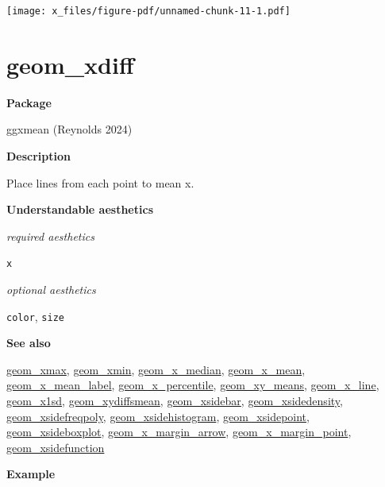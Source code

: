 \documentclass[
  letterpaper,
  DIV=11,
  numbers=noendperiod]{scrreprt}
\begin{document}
\texttt{[image: x\_files/figure-pdf/unnamed-chunk-11-1.pdf]}

\section{geom\_xdiff}\label{xdiff}

\textbf{Package}

ggxmean (Reynolds 2024)

\textbf{Description}

Place lines from each point to mean x.

\textbf{Understandable aesthetics}

\emph{required aesthetics}

\texttt{x}

\emph{optional aesthetics}

\texttt{color}, \texttt{size}

\textbf{See also}

\href{@xmax}{geom\_xmax}, \href{@xmin}{geom\_xmin},
\href{@x_median}{geom\_x\_median}, \href{@x_mean}{geom\_x\_mean},
\href{@x_mean_label}{geom\_x\_mean\_label},
\href{@x_percentile}{geom\_x\_percentile},
\href{@xy_means}{geom\_xy\_means}, \href{@x_line}{geom\_x\_line},
\href{@x1sd}{geom\_x1sd}, \href{@xydiffsmean}{geom\_xydiffsmean},
\href{@xsidebar}{geom\_xsidebar},
\href{@xsidedensity}{geom\_xsidedensity},
\href{@xsidefreqpoly}{geom\_xsidefreqpoly},
\href{@xsidehistogram}{geom\_xsidehistogram},
\href{@xsidepoint}{geom\_xsidepoint},
\href{@xsideboxplot}{geom\_xsideboxplot},
\href{@x_margin_arrow}{geom\_x\_margin\_arrow},
\href{@x_margin_point}{geom\_x\_margin\_point},
\href{@xsidefunction}{geom\_xsidefunction}

\textbf{Example }
\end{document}

